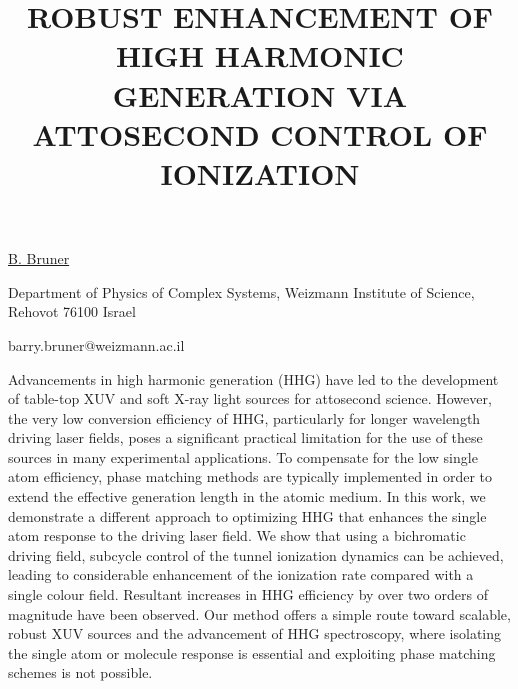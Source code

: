 \title{ROBUST ENHANCEMENT OF HIGH HARMONIC GENERATION VIA ATTOSECOND CONTROL OF IONIZATION}

\underline{B. Bruner} 

{\normalsize{\vspace{-4mm}
Department of Physics of Complex Systems,
Weizmann Institute of Science,
Rehovot 76100 Israel

\email barry.bruner@weizmann.ac.il}}

Advancements in high harmonic generation (HHG) have led to the development of table-top XUV and soft X-ray light sources for attosecond science.  However, the very low conversion efficiency of HHG, particularly for longer wavelength driving laser fields, poses a significant practical limitation for the use of these sources in many experimental applications.  To compensate for the low single atom efficiency, phase matching methods are typically implemented in order to extend the effective generation length in the atomic medium.  In this work, we demonstrate a different approach to optimizing HHG that enhances the single atom response to the driving laser field.  We show that using a bichromatic driving field, subcycle control of the tunnel ionization dynamics can be achieved, leading to considerable enhancement of the ionization rate compared with a single colour field.  Resultant increases in HHG efficiency by over two orders of magnitude have been observed.  Our method offers a simple route toward scalable, robust XUV sources and the advancement of HHG spectroscopy, where isolating the single atom or molecule response is essential and exploiting phase matching schemes is not possible.

\vspace{\baselineskip} 